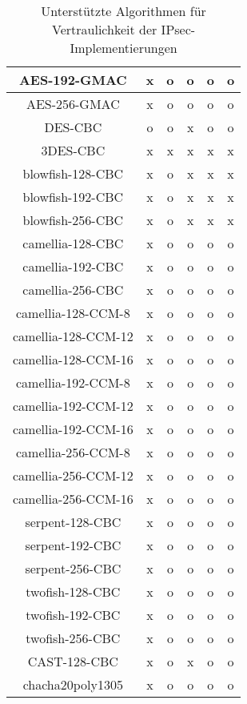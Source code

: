 \begin{table}[h]
\begin{tabular*}{\textwidth}{|c|c|c|c|c|c|}
AES-192-GMAC         &  x  & o & o & o & o \\  \hline
AES-256-GMAC         &  x  & o & o & o & o \\  \hline
DES-CBC              &  o  & o & x & o & o \\  \hline
3DES-CBC             &  x  & x & x & x & x \\  \hline
blowfish-128-CBC     &  x  & o & x & x & x \\  \hline
blowfish-192-CBC     &  x  & o & x & x & x \\  \hline
blowfish-256-CBC     &  x  & o & x & x & x \\  \hline
camellia-128-CBC     &  x  & o & o & o & o \\  \hline
camellia-192-CBC     &  x  & o & o & o & o \\  \hline
camellia-256-CBC     &  x  & o & o & o & o \\  \hline
camellia-128-CCM-8   &  x  & o & o & o & o \\  \hline
camellia-128-CCM-12  &  x  & o & o & o & o \\  \hline
camellia-128-CCM-16  &  x  & o & o & o & o \\  \hline
camellia-192-CCM-8   &  x  & o & o & o & o \\  \hline
camellia-192-CCM-12  &  x  & o & o & o & o \\  \hline
camellia-192-CCM-16  &  x  & o & o & o & o \\  \hline
camellia-256-CCM-8   &  x  & o & o & o & o \\  \hline
camellia-256-CCM-12  &  x  & o & o & o & o \\  \hline
camellia-256-CCM-16  &  x  & o & o & o & o \\  \hline
serpent-128-CBC      &  x  & o & o & o & o \\  \hline
serpent-192-CBC      &  x  & o & o & o & o \\  \hline
serpent-256-CBC      &  x  & o & o & o & o \\  \hline
twofish-128-CBC      &  x  & o & o & o & o \\  \hline
twofish-192-CBC      &  x  & o & o & o & o \\  \hline
twofish-256-CBC      &  x  & o & o & o & o \\  \hline
CAST-128-CBC         &  x  & o & x & o & o \\  \hline
chacha20poly1305     &  x  & o & o & o & o \\  \hline
\end{tabular*}
\label{tab:IPsec-Implementierungen-Vertraulichkeit-Algorithmen}
\caption{Unterstützte Algorithmen für Vertraulichkeit der IPsec-Implementierungen}
\end{table}

